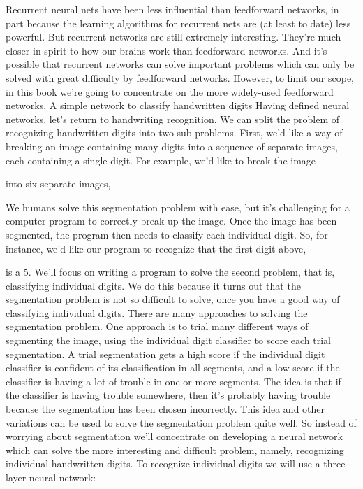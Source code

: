 Recurrent neural nets have been less influential than feedforward networks, in part because the learning algorithms for recurrent nets are (at least to date) less powerful. But recurrent networks are still extremely interesting. They're much closer in spirit to how our brains work than feedforward networks. And it's possible that recurrent networks can solve important problems which can only be solved with great difficulty by feedforward networks. However, to limit our scope, in this book we're going to concentrate on the more widely-used feedforward networks.
A simple network to classify handwritten digits
Having defined neural networks, let's return to handwriting recognition. We can split the problem of recognizing handwritten digits into two sub-problems. First, we'd like a way of breaking an image containing many digits into a sequence of separate images, each containing a single digit. For example, we'd like to break the image

into six separate images,

We humans solve this segmentation problem with ease, but it's challenging for a computer program to correctly break up the image. Once the image has been segmented, the program then needs to classify each individual digit. So, for instance, we'd like our program to recognize that the first digit above,

is a 5.
We'll focus on writing a program to solve the second problem, that is, classifying individual digits. We do this because it turns out that the segmentation problem is not so difficult to solve, once you have a good way of classifying individual digits. There are many approaches to solving the segmentation problem. One approach is to trial many different ways of segmenting the image, using the individual digit classifier to score each trial segmentation. A trial segmentation gets a high score if the individual digit classifier is confident of its classification in all segments, and a low score if the classifier is having a lot of trouble in one or more segments. The idea is that if the classifier is having trouble somewhere, then it's probably having trouble because the segmentation has been chosen incorrectly. This idea and other variations can be used to solve the segmentation problem quite well. So instead of worrying about segmentation we'll concentrate on developing a neural network which can solve the more interesting and difficult problem, namely, recognizing individual handwritten digits.
To recognize individual digits we will use a three-layer neural network:

